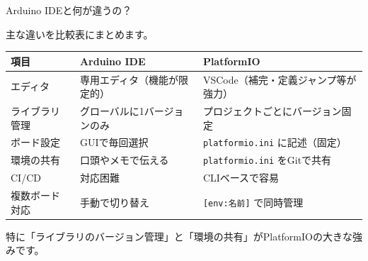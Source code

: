 \begin{qabox}{Arduino IDEと何が違うの？}

主な違いを比較表にまとめます。

\vspace{2mm}
\begin{tabularx}{\textwidth}{l X X}
\toprule
\textbf{項目} & \textbf{Arduino IDE} & \textbf{PlatformIO} \\
\midrule
エディタ & 専用エディタ（機能が限定的） & VSCode（補完・定義ジャンプ等が強力） \\
\midrule
ライブラリ管理 & グローバルに1バージョンのみ & プロジェクトごとにバージョン固定 \\
\midrule
ボード設定 & GUIで毎回選択 & \texttt{platformio.ini} に記述（固定） \\
\midrule
環境の共有 & 口頭やメモで伝える & \texttt{platformio.ini} をGitで共有 \\
\midrule
CI/CD & 対応困難 & CLIベースで容易 \\
\midrule
複数ボード対応 & 手動で切り替え & \texttt{[env:名前]} で同時管理 \\
\bottomrule
\end{tabularx}

\vspace{3mm}
特に「ライブラリのバージョン管理」と「環境の共有」がPlatformIOの大きな強みです。

\end{qabox}

